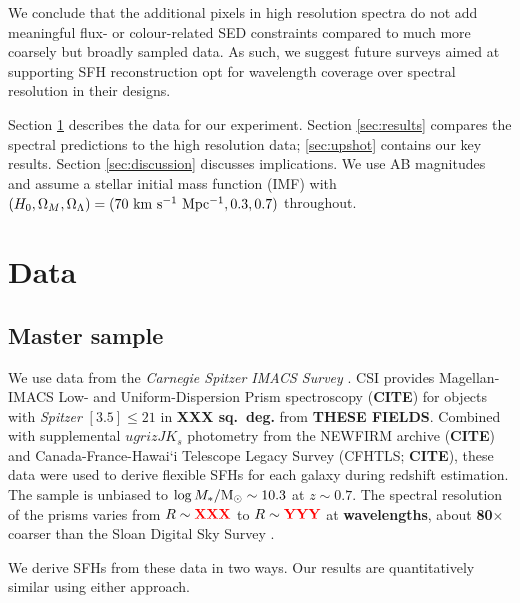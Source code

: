 \documentclass[a4paper,fleqn,usenatbib]{mnras}
\newcommand{\Msun}{{\rm M}_\odot}
\newcommand{\Mstel}{M_\ast}
\newcommand{\logM}{\log\Mstel/\Msun}
\newcommand{\bfr}{\bf\color{red}}
\newcommand{\CITE}{{\bfr CITE}}
\begin{document}
We conclude that the additional pixels in high resolution spectra do not add meaningful 
flux- or colour-related SED constraints compared to much more coarsely but broadly sampled data.
As such, we suggest future surveys aimed at supporting SFH reconstruction opt for 
wavelength coverage over spectral resolution in their designs.

Section \ref{sec:data} describes the data for our experiment. Section \ref{sec:results} compares 
the spectral predictions to the high resolution data; \ref{sec:upshot} contains our key results. 
Section \ref{sec:discussion} discusses implications. We use AB magnitudes and assume 
a \citet{Chabrier03} stellar initial mass function (IMF) with $(H_{0}, \Omega_{M}, \Omega_{\Lambda}) =
(70~{\rm km~s^{-1}~Mpc^{-1}}, 0.3, 0.7)$ throughout.



\section{Data}
\label{sec:data}

\subsection{Master sample}
\label{sec:master}

We use data from the {\it Carnegie Spitzer IMACS Survey} \citep[CSI;][]{Kelson14a}. CSI provides
Magellan-IMACS Low- and Uniform-Dispersion Prism spectroscopy (\CITE) for objects with {\it Spitzer} 
$[3.5]\leq21$ in {\bfr XXX sq.~deg.} from {\bfr THESE FIELDS}. Combined with supplemental 
$ugrizJK_{s}$ photometry from the NEWFIRM archive (\CITE) and Canada-France-Hawai`i Telescope 
Legacy Survey (CFHTLS; \CITE), these data were used to derive flexible SFHs for each galaxy
during redshift estimation. The sample is unbiased to $\logM\sim10.3$ at $z\sim0.7$.
The spectral resolution of the prisms varies from $R\sim{\bfr XXX}$ to $R\sim{\bfr YYY}$ at
{\bfr wavelengths}, about {\bfr 80$\times$} coarser than the Sloan Digital Sky Survey \citep{York00}.

We derive SFHs from these data in two ways. Our results are quantitatively similar
using either approach.

\end{document}
